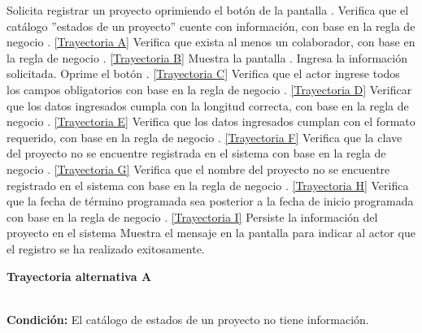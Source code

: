 	\begin{UCtrayectoria}
		\UCpaso[\UCactor] Solicita registrar un proyecto oprimiendo el botón  de la pantalla .
		\UCpaso[\UCsist] Verifica que el catálogo ''estados de un proyecto'' cuente con información, con base en la regla de negocio . \hyperlink{CU2-1:TAA}{[Trayectoria A]}
		\UCpaso[\UCsist] Verifica que exista al menos un colaborador, con base en la regla de negocio . \hyperlink{CU2-1:TAB}{[Trayectoria B]}
		\UCpaso[\UCsist] Muestra la pantalla .
		\UCpaso[\UCactor] Ingresa la información solicitada. \label{CU2.1-P5}
		\UCpaso[\UCactor] Oprime el botón . \hyperlink{CU2-1:TAC}{[Trayectoria C]}
		\UCpaso[\UCsist] Verifica que el actor ingrese todos los campos obligatorios con base en la regla de negocio . \hyperlink{CU2-1:TAD}{[Trayectoria D]}
		\UCpaso[\UCsist] Verificar que los datos ingresados cumpla con la longitud correcta, con base en la regla de negocio . \hyperlink{CU2-1:TAE}{[Trayectoria E]}
		\UCpaso[\UCsist] Verifica que los datos ingresados cumplan con el formato requerido, con base en la regla de negocio . \hyperlink{CU2-1:TAF}{[Trayectoria F]}
		\UCpaso[\UCsist] Verifica que la clave del proyecto no se encuentre registrada en el sistema con base en la regla de negocio . \hyperlink{CU2-1:TAG}{[Trayectoria G]}
		\UCpaso[\UCsist] Verifica que el nombre del proyecto no se encuentre registrado en el sistema con base en la regla de negocio . \hyperlink{CU2-1:TAH}{[Trayectoria H]}
		\UCpaso[\UCsist] Verifica que la fecha de término programada sea posterior a la fecha de inicio programada con base en la regla de negocio . \hyperlink{CU2-1:TAI}{[Trayectoria I]}
		\UCpaso[\UCsist] Persiste la información del proyecto en el sistema
		\UCpaso[\UCsist] Muestra el mensaje  en la pantalla  para indicar al actor que el registro se ha realizado exitosamente.
	\end{UCtrayectoria}		
\hypertarget{CU2-1:TAA}{\textbf{Trayectoria alternativa A}}\\
\noindent \textbf{Condición:} El catálogo de estados de un proyecto no tiene información.
